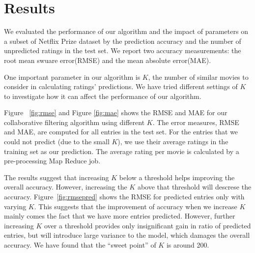 \section{Results}
We evaluated the performance of our algorithm and the impact of
parameters on a subset of Netflix Prize dataset by the prediction
accuracy and the number of unpredicted ratings in the test set. We
report two accuracy measurements: the root mean swuare error(RMSE) and
the mean absolute error(MAE).

One important parameter in our algorithm is $K$, the number of similar
movies to consider in calculating ratings' predictions. We have tried
different settings of $K$ to investigate how it can affect the
performance of our algorithm.


Figure ~\ref{fig:rmse} and Figure \ref{fig:mae} shows the RMSE and MAE
for our collaborative filtering algorithm using different $K$. The
error measures, RMSE and MAE, are computed for all entries in the test
set. For the entries that we could not predict (due to the small $K$),
we use their average ratings in the training set as our
prediction. The average rating per movie is calculated by a
pre-processing Map Reduce job.

The results suggest that increasing $K$ below a threshold helps
improving the overall accuracy. However, increasing the $K$ above that
threshold will descrese the accuracy. Figure~\ref{fig:rmsepred} shows
the RMSE for predicted entries only with varying $K$. This suggests
that the improvement of accuracy when we increase $K$ mainly comes the
fact that we have more entries predicted. However, further increasing
$K$ over a threshold provides only insignificant gain in ratio of
predicted entries, but will introduce large variance to the model,
which damages the overall accuracy. We have found that the ``sweet
point'' of $K$ is around 200.

